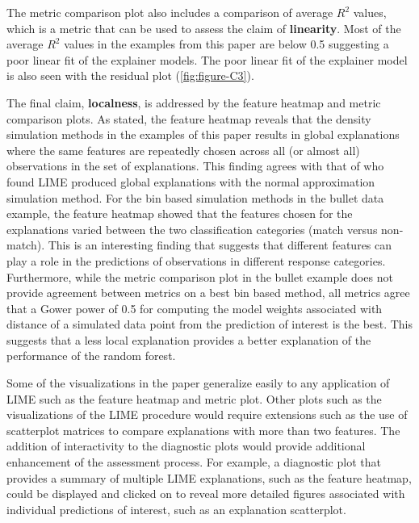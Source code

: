 \documentclass[AMS,STIX2COL]{WileyNJD-v2}\usepackage[]{graphicx}\usepackage[]{color}
\begin{document}
The metric comparison plot also includes a comparison of average $R^2$ values, which is a metric that can be used to assess the claim of \textbf{linearity}. Most of the average $R^2$ values in the examples from this paper are below 0.5 suggesting a poor linear fit of the explainer models. The poor linear fit of the explainer model is also seen with the residual plot (\autoref{fig:figure-C3}).

The final claim, \textbf{localness}, is addressed by the feature heatmap and metric comparison plots. As stated, the feature heatmap reveals that the density simulation methods in the examples of this paper results in global explanations where the same features are repeatedly chosen across all (or almost all) observations in the set of explanations. This finding agrees with that of \citep{laugel:2018} who found LIME produced global explanations with the normal approximation simulation method. For the bin based simulation methods in the bullet data example, the feature heatmap showed that the features chosen for the explanations varied between the two classification categories (match versus non-match). This is an interesting finding that suggests that different features can play a role in the predictions of observations in different response categories.  Furthermore, while the metric comparison plot in the bullet example does not provide agreement between metrics on a best bin based method, all metrics agree that a Gower power of 0.5 for computing the model weights associated with distance of a simulated data point from the prediction of interest is the best. This suggests that a less local explanation provides a better explanation of the performance of the random forest.

Some of the visualizations in the paper generalize easily to any application of LIME such as the feature heatmap and metric plot. Other plots such as the visualizations of the LIME procedure would require extensions such as the use of scatterplot matrices to compare explanations with more than two features. The addition of interactivity to the diagnostic plots would provide additional enhancement of the assessment process. For example, a diagnostic plot that provides a summary of multiple LIME explanations, such as the feature heatmap, could be displayed and clicked on to reveal more detailed figures associated with individual predictions of interest, such as an explanation scatterplot.
\end{document}
